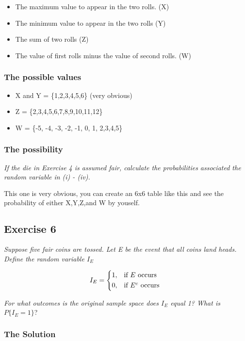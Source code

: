 \documentclass[12pt,a4paper]{article}
\begin{document}
\begin{itemize}
	\item The maximum value to appear in the two rolls. (X)
	\item The minimum value to appear in the two rolls (Y)
	\item The sum of two rolls (Z)
	\item The value of first rolls minus the  value of second rolls. (W)
\end{itemize}

\subsubsection{The possible values}

\begin{itemize}
	\item X and Y = \{1,2,3,4,5,6\} (very obvious)
	\item Z = \{2,3,4,5,6,7,8,9,10,11,12\}
	\item W = \{-5, -4, -3, -2, -1, 0, 1, 2,3,4,5\}
\end{itemize}

\subsubsection{The possibility}

\textit{If the die in Exercise 4 is assumed fair, calculate the probabilities associated the random variable in (i) - (iv).}

This one is very obvious, you can create an 6x6 table like this and see the probability of either X,Y,Z,and W by youself.

\subsection{Exercise 6}

\textit{Suppose five fair coins are tossed. Let E be the event that all coins land heads. Define the random variable $I_E$}

\[
I_E = \begin{dcases*}
1, & if $E$ occurs \\
0, & if $E^c$ occurs 
\end{dcases*}
\]

\textit{For what outcomes is the original sample space does $I_E$ equal 1? What is $P\{I_E = 1\}$}?

\subsubsection{The Solution}
\end{document}
